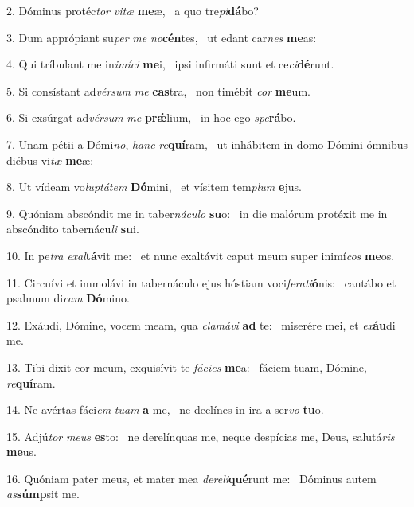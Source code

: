 2. Dóminus protéc\textit{tor} \textit{vi}\textit{tæ} \textbf{me}æ, \ast\  a quo tre\textit{pi}\textbf{dá}bo?\

3. Dum apprópiant su\textit{per} \textit{me} \textit{no}\textbf{cén}tes, \ast\  ut edant car\textit{nes} \textbf{me}as:\

4. Qui tríbulant me in\textit{i}\textit{mí}\textit{ci} \textbf{me}i, \ast\  ipsi infirmáti sunt et ce\textit{ci}\textbf{dé}runt.\

5. Si consístant ad\textit{vér}\textit{sum} \textit{me} \textbf{cas}tra, \ast\  non timébit \textit{cor} \textbf{me}um.\

6. Si exsúrgat ad\textit{vér}\textit{sum} \textit{me} \textbf{prǽ}lium, \ast\  in hoc ego \textit{spe}\textbf{rá}bo.\

7. Unam pétii a Dómi\textit{no}, \textit{hanc} \textit{re}\textbf{quí}ram, \ast\  ut inhábitem in domo Dómini ómnibus diébus vi\textit{tæ} \textbf{me}æ:\

8. Ut vídeam vo\textit{lup}\textit{tá}\textit{tem} \textbf{Dó}mini, \ast\  et vísitem tem\textit{plum} \textbf{e}jus.\

9. Quóniam abscóndit me in taber\textit{ná}\textit{cu}\textit{lo} \textbf{su}o: \ast\  in die malórum protéxit me in abscóndito tabernácu\textit{li} \textbf{su}i.\

10. In pe\textit{tra} \textit{ex}\textit{al}\textbf{tá}vit me: \ast\  et nunc exaltávit caput meum super inimí\textit{cos} \textbf{me}os.\

11. Circuívi et immolávi in tabernáculo ejus hóstiam voci\textit{fe}\textit{ra}\textit{ti}\textbf{ó}nis: \ast\  cantábo et psalmum di\textit{cam} \textbf{Dó}mino.\

12. Exáudi, Dómine, vocem meam, qua \textit{cla}\textit{má}\textit{vi} \textbf{ad} te: \ast\  miserére mei, et \textit{ex}\textbf{áu}di me.\

13. Tibi dixit cor meum, exquisívit te \textit{fá}\textit{ci}\textit{es} \textbf{me}a: \ast\  fáciem tuam, Dómine, \textit{re}\textbf{quí}ram.\

14. Ne avértas fáci\textit{em} \textit{tu}\textit{am} \textbf{a} me, \ast\  ne declínes in ira a ser\textit{vo} \textbf{tu}o.\

15. Adjú\textit{tor} \textit{me}\textit{us} \textbf{es}to: \ast\  ne derelínquas me, neque despícias me, Deus, salutá\textit{ris} \textbf{me}us.\

16. Quóniam pater meus, et mater mea \textit{de}\textit{re}\textit{li}\textbf{qué}runt me: \ast\  Dóminus autem \textit{as}\textbf{súmp}sit me.\


